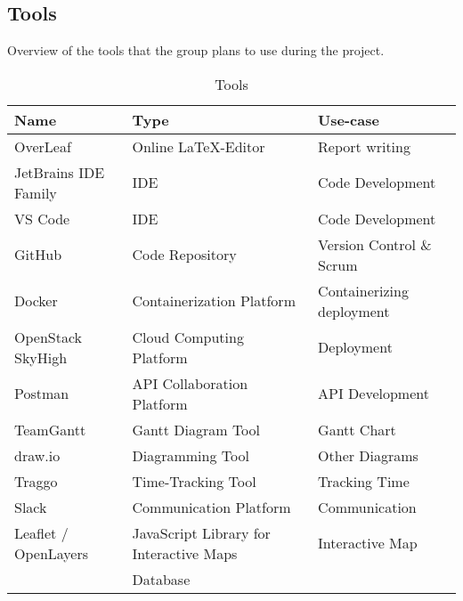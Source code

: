 \subsection{Tools}\label{sec:tools}
Overview of the tools that the group plans to use during the project.
\begin{table} [H]
    \centering
    \begin{tabular}{|l|l|l|}
    \hline
    Name & Type & Use-case \\
    \hline
    OverLeaf & Online \LaTeX-Editor & Report writing \\
    JetBrains IDE Family & IDE & Code Development \\
    VS Code & IDE & Code Development \\
    GitHub & Code Repository & Version Control \& Scrum \\
    Docker & Containerization Platform & Containerizing deployment \\
    OpenStack SkyHigh & Cloud Computing Platform & Deployment \\
    Postman & API Collaboration Platform & API Development \\
    TeamGantt & Gantt Diagram Tool & Gantt Chart \\
    draw.io & Diagramming Tool & Other Diagrams \\
    Traggo & Time-Tracking Tool & Tracking Time \\
    Slack & Communication Platform & Communication \\
    Leaflet / OpenLayers & JavaScript Library for Interactive Maps & Interactive Map  \\
     & Database & \\
    \hline
    \end{tabular}
    \caption{Tools}
    \label{tab:tools}
\end{table}


